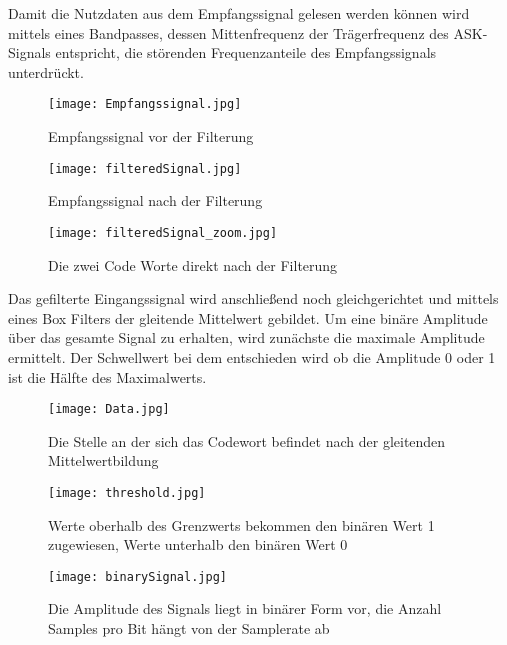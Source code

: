\documentclass[10pt]{article}
\begin{document}
Damit die Nutzdaten aus dem Empfangssignal gelesen werden können wird mittels eines Bandpasses, dessen Mittenfrequenz der Trägerfrequenz des ASK-Signals entspricht, die störenden Frequenzanteile des Empfangssignals unterdrückt.
 
\begin{figure}[h!]
	\centering
	\texttt{[image: Empfangssignal.jpg]}
	\caption{Empfangssignal vor der Filterung}
	\label{img:1bit}
\end{figure} 

\begin{figure}[h!]
	\centering
	\texttt{[image: filteredSignal.jpg]}
	\caption{Empfangssignal nach der Filterung}
	\label{img:1bit}
\end{figure}  
\begin{figure}[h!]
	\centering
	\texttt{[image: filteredSignal\_zoom.jpg]}
	\caption{Die zwei Code Worte direkt nach der Filterung}
	\label{img:1bit}
\end{figure}  
\clearpage
Das gefilterte Eingangssignal wird anschließend noch gleichgerichtet und mittels eines Box Filters der gleitende Mittelwert gebildet. Um eine binäre Amplitude über das gesamte Signal zu erhalten, wird zunächste die maximale Amplitude ermittelt. Der Schwellwert bei dem entschieden wird ob die Amplitude 0 oder 1 ist die Hälfte des Maximalwerts.

\begin{figure}[h!]
	\centering
	\texttt{[image: Data.jpg]}
	\caption{Die Stelle an der sich das Codewort befindet nach der gleitenden Mittelwertbildung}
	\label{img:1bit}
\end{figure}
\begin{figure}[h!]
	\centering
	\texttt{[image: threshold.jpg]}
	\caption{Werte oberhalb des Grenzwerts bekommen den binären Wert 1 zugewiesen, Werte unterhalb den binären Wert 0}
	\label{img:1bit}
\end{figure}
\begin{figure}[h!]
	\centering
	\texttt{[image: binarySignal.jpg]}
	\caption{Die Amplitude des Signals liegt in binärer Form vor, die Anzahl Samples pro Bit hängt von der Samplerate ab}
	\label{img:1bit}
\end{figure}
\clearpage
\newpage
\end{document}
